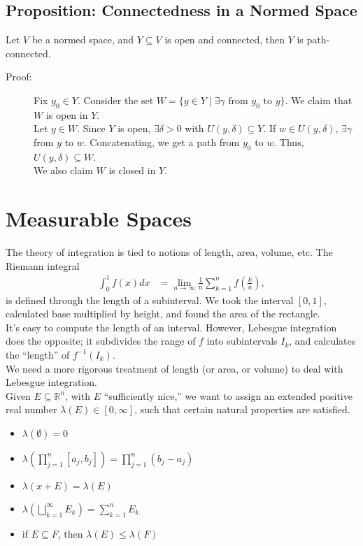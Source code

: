\documentclass[9pt]{extarticle}
\newcommand{\R}{\mathbb{R}}
\begin{document}
  \subsection{Proposition: Connectedness in a Normed Space}%
  Let $V$ be a normed space, and $Y\subseteq V$ is open and connected, then $Y$ is path-connected.
  \begin{description}
    \item[Proof:] Fix $y_0\in Y$. Consider the set $W = \{y\in Y\mid \exists \gamma\text{ from $y_0$ to $y$}\}$. We claim that $W$ is open in $Y$.\\

      Let $y\in W$. Since $Y$ is open, $\exists \delta > 0$ with $U(y,\delta)\subseteq Y$. If $w\in U(y,\delta)$, $\exists \gamma$ from $y$ to $w$. Concatenating, we get a path from $y_0$ to $w$. Thus, $U(y,\delta)\subseteq W$.\\

      We also claim $W$ is closed in $Y$.
  \end{description}
  \section{Measurable Spaces}%
  The theory of integration is tied to notions of length, area, volume, etc. The Riemann integral
  \begin{align*}
    \int_{0}^{1} f(x)dx &= \lim_{n\rightarrow\infty}\frac{1}{n}\sum_{k=1}^{n}f\left(\frac{k}{n}\right),
  \end{align*}
  is defined through the length of a subinterval. We took the interval $[0,1]$, calculated base multiplied by height, and found the area of the rectangle.\\

  It's easy to compute the length of an interval. However, Lebesgue integration does the opposite; it subdivides the range of $f$ into subintervals $I_k$, and calculates the ``length'' of $f^{-1}(I_k)$.\\

  We need a more rigorous treatment of length (or area, or volume) to deal with Lebesgue integration.\\

  Given $E\subseteq \R^n$, with $E$ ``sufficiently nice,'' we want to assign an extended positive real number $\lambda(E)\in [0,\infty]$, such that certain natural properties are satisfied.
  \begin{itemize}
    \item $\lambda(\emptyset) = 0$
    \item $\displaystyle \lambda \left(\prod_{j=1}^{n}[a_j,b_j]\right) = \prod_{j=1}^{n}(b_j-a_j)$
    \item $\lambda(x + E) = \lambda(E)$
    \item $\displaystyle \lambda \left(\bigsqcup_{k=1}^{\infty}E_k\right) = \sum_{k=1}^{n}E_k$
    \item if $E\subseteq F$, then $\lambda(E)\leq \lambda(F)$
  \end{itemize}
\end{document}
